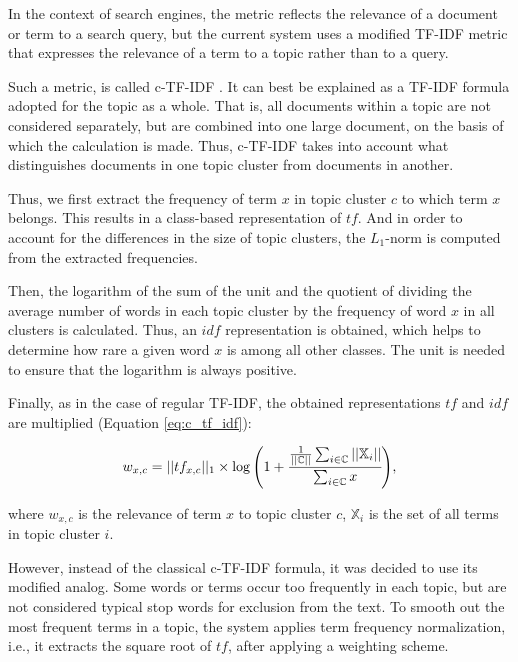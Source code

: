 In the context of search engines, the metric reflects the relevance of a document or
term to a search query, but the current system uses a modified TF-IDF metric that
expresses the relevance of a term to a topic rather than to a query.

Such a metric, is called c-TF-IDF \parencite{BERTopic2022}. It can best be explained as a TF-IDF
formula adopted for the topic as a whole. That is, all documents within a topic
are not considered separately, but are combined into one large document, on the basis
of which the calculation is made. Thus, c-TF-IDF takes into account what distinguishes
documents in one topic cluster from documents in another.

Thus, we first extract the frequency of term $x$ in topic cluster $c$ to which term
$x$ belongs. This results in a class-based representation of $tf$. And in order
to account for the differences in the size of topic clusters, the $L_1$-norm is computed
from the extracted frequencies.

Then, the logarithm of the sum of the unit and the quotient of dividing the average number
of words in each topic cluster by the frequency of word $x$ in all clusters is calculated.
Thus, an $idf$ representation is obtained, which helps to determine how rare a given word
$x$ is among all other classes. The unit is needed to ensure that the logarithm is always
positive.

Finally, as in the case of regular TF-IDF, the obtained representations $tf$ and $idf$
are multiplied (Equation \ref{eq:c_tf_idf}):

\begin{equation}\label{eq:c_tf_idf}
    w_{x, c} =
    ||tf_{x, c}||_1
    \times
    \log\Bigg(
        1 + \cfrac{
            \frac{1}{||\mathbb{C}||}\sum_{i \in \mathbb{C}}||\mathbb{X}_i||
        }{
            \sum_{i \in \mathbb{C}}x
        }
    \Bigg),
\end{equation}

where $w_{x, c}$ is the relevance of term $x$ to topic cluster $c$, $\mathbb{X}_i$ is the set
of all terms in topic cluster $i$.

However, instead of the classical c-TF-IDF formula, it was decided to use its modified analog.
Some words or terms occur too frequently in each topic, but are not considered typical stop words
for exclusion from the text. To smooth out the most frequent terms in a topic, the system applies
term frequency normalization, i.e., it extracts the square root of $tf$, after applying a weighting
scheme.

